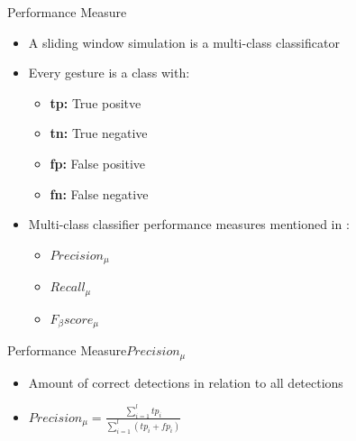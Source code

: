 \begin{frame}{Performance Measure}
    \begin{center}
        \begin{itemize}
            \item A sliding window simulation is a multi-class classificator

            \item Every gesture is a class with:

            \begin{itemize}
                \item \textbf{tp:} True positve

                \item \textbf{tn:} True negative

                \item \textbf{fp:} False positive

                \item \textbf{fn:} False negative
            \end{itemize}

            \item Multi-class classifier performance measures mentioned in \cite{sokolova2009systematic}:

            \begin{itemize}
                \item $Precision_{\mu}$

                \item $Recall_{\mu}$

                \item $F_{\beta}score_{\mu}$
            \end{itemize}
        \end{itemize}
    \end{center}
\end{frame}

\begin{frame}{Performance Measure}{$Precision_{\mu}$}
    \begin{center}
        \begin{itemize}
            \item Amount of correct detections in relation to all detections

            \item $Precision_{\mu} = \frac{\sum \limits_{i=1}^{l} tp_i}{\sum \limits_{i=1}^{l} (tp_i + fp_i)}$
        \end{itemize}
    \end{center}
\end{frame}

